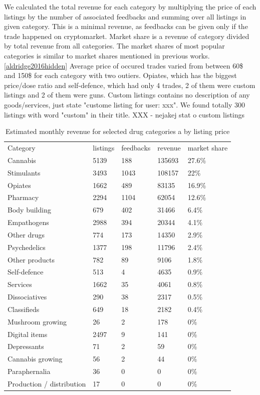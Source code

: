 \documentclass[
  digital, %
  table,   %
  lof,     %
  lot,     %
  oneside
]{fithesis3}
\begin{document}
We calculated the total revenue for each category
by multiplying the price of each listings by the number of associated feedbacks
and summing over all listings in given category. This is a minimal revenue, as feedbacks
can be given only if the trade happened on cryptomarket.
Market share is a revenue of category divided by total revenue from all categories.
The market shares of most popular categories is similar
to market shares mentioned in previous works.\ref{aldridge2016hidden}
Average price of occured trades varied from between 60\$ and 150\$ for each category
with two outiers. Opiates, which has the biggest price/dose ratio and 
self-defence, which had only 4 trades, 2 of them were custom listings and 2 of them were guns.
Custom listings contains no description of any goods/services, just state "custome listing for user: xxx".
We found totally 300 listings with word "custom" in their title. XXX - nejakej stat o custom listings

\begin{table}
    \caption{Estimated monthly revenue for selected drug categories a by listing price}
    \label{categories}
    \begin{tabular}{|l|l|l|l|l|}
Category & listings & feedbacks & revenue & market share \\
Cannabis & 5139 & 188 & 135693 & 27.6\% \\
Stimulants & 3493 & 1043 & 108157 & 22\% \\
Opiates & 1662 & 489 & 83135 & 16.9\% \\
Pharmacy & 2294 & 1104 & 62054 & 12.6\% \\
Body building & 679 & 402 & 31466 & 6.4\% \\
Empathogens & 2988 & 394 & 20344 & 4.1\% \\
Other drugs &  774 & 173 & 14350 & 2.9\% \\
Psychedelics & 1377 & 198 & 11796 & 2.4\% \\
Other products &  782 & 89 & 9106 & 1.8\% \\
Self-defence &  513 & 4 & 4635 & 0.9\% \\
Services & 1662 & 35 & 4061 & 0.8\% \\
Dissociatives &  290 & 38 & 2317 & 0.5\% \\
Classifieds &  649 & 18 & 2182 & 0.4\% \\
Mushroom growing &   26 & 2 & 178 & 0\% \\
Digital items & 2497 & 9 & 141 & 0\% \\
Depressants &   71 & 2 & 59 & 0\% \\
Cannabis growing &  56 & 2 & 44 & 0\% \\
Paraphernalia  &  36 & 0 & 0 & 0\% \\
Production / distribution &   17 & 0 & 0 & 0\% 
    \end{tabular}
\end{table}
\end{document}
